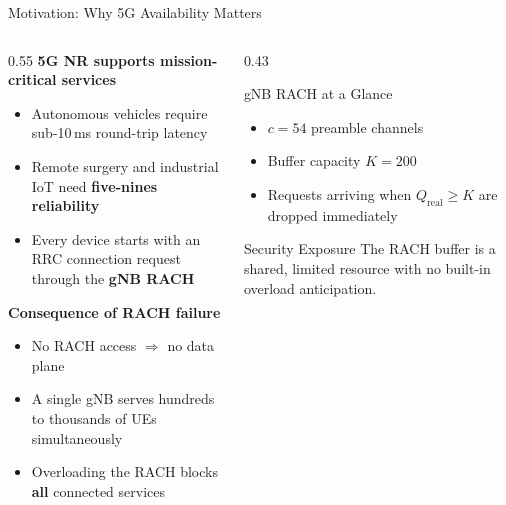 \documentclass[aspectratio=169,t]{beamer}
\newcommand{\qreal}{Q_{\mathrm{real}}}
\begin{document}
\begin{frame}{Motivation: Why 5G Availability Matters}

  \begin{columns}[T]
    \begin{column}{0.55\textwidth}
      \small
      \textbf{5G NR supports mission-critical services}

      \vspace{2pt}
      \begin{itemize}\setlength\itemsep{2pt}
        \item Autonomous vehicles require sub-10\,ms round-trip latency
        \item Remote surgery and industrial IoT need \textbf{five-nines reliability}
        \item Every device starts with an RRC connection request through the \textbf{gNB RACH}
      \end{itemize}

      \vspace{4pt}
      \textbf{Consequence of RACH failure}

      \vspace{2pt}
      \begin{itemize}\setlength\itemsep{2pt}
        \item No RACH access $\Rightarrow$ no data plane
        \item A single gNB serves hundreds to thousands of UEs simultaneously
        \item Overloading the RACH blocks \textbf{all} connected services
      \end{itemize}
    \end{column}

    \begin{column}{0.43\textwidth}
      \begin{block}{gNB RACH at a Glance}
        \small
        \begin{itemize}\setlength\itemsep{4pt}
          \item $c = 54$ preamble channels
          \item Buffer capacity $K = 200$
          \item Requests arriving when $\qreal \geq K$ are dropped immediately
        \end{itemize}
      \end{block}

      \vspace{10pt}
      \begin{alertblock}{Security Exposure}
        \small
        The RACH buffer is a shared, limited resource with no built-in overload anticipation.
      \end{alertblock}
    \end{column}
  \end{columns}

\end{frame}
\end{document}
